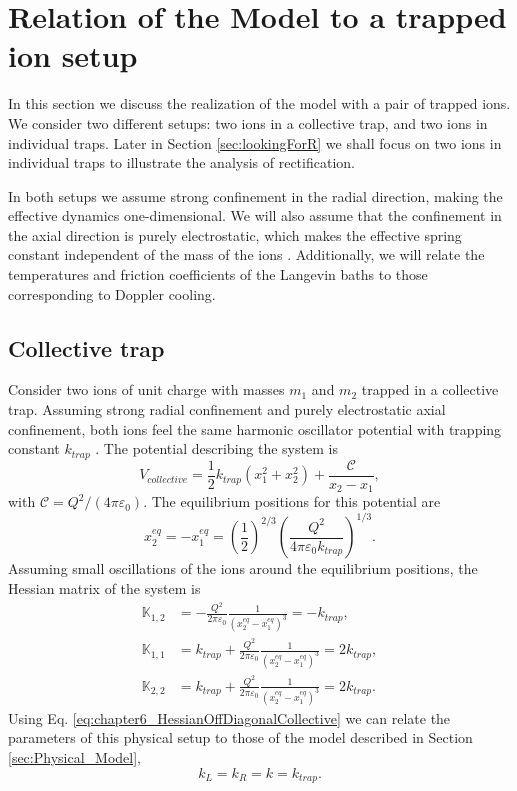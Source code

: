 \section{Relation of the Model to a trapped ion setup \label{sec:TrappedIonSetUp}}
%
In this section we discuss the realization of the model with  a pair of trapped ions. We consider two different setups: two ions in a collective trap, and two ions in individual traps. Later in Section \ref{sec:lookingForR} we shall focus on two ions in individual traps to illustrate the analysis of rectification.

In both setups we assume strong confinement in the radial direction, making the effective dynamics one-dimensional. We will also assume that the confinement in the axial direction is purely electrostatic, which makes the effective spring constant independent of the mass of the ions \cite{Leibfried2003}. Additionally, we will relate the temperatures and friction coefficients of the Langevin baths to those corresponding to Doppler cooling.
%
%
\subsection{Collective trap}
%
%
Consider two ions of unit charge with masses $m_1$ and $m_2$ trapped in a collective trap. Assuming strong radial confinement and purely electrostatic axial confinement, both ions feel the same harmonic oscillator potential with trapping constant $k_{trap}$ \cite{Leibfried2003}. The potential describing the system is
%
\begin{equation}
  V_{collective} = \frac{1}{2}k_{trap} \left( x_1^2 + x_2^2\right) + \frac{\mathcal{C}}{x_2-x_1},
\end{equation}
%
with $\mathcal{C}={Q^2}/({4\pi\varepsilon_0})$. The equilibrium positions for this potential are
%
\begin{equation}
  x_2^{eq} = -x_1^{eq} =
  \label{eq:chapter6_equilibriumPositionsCollectiveTrap}\left(\frac{1}{2}\right)^{2/3} \left(\frac{Q^2}{4\pi\varepsilon_0 k_{trap}}\right)^{1/3}.
\end{equation}
%
Assuming small oscillations of the ions around the equilibrium positions, the Hessian matrix of the system is
%
\begin{align}
  \mathbb{K}_{1,2} &= -\frac{Q^2}{2\pi\varepsilon_0}\frac{1}{(x_2^{eq}-x_1^{eq})^3} = -k_{trap},\nonumber
  \\
  \mathbb{K}_{1,1} &= k_{trap} + \frac{Q^2}{2\pi\varepsilon_0}\frac{1}{(x_2^{eq}-x_1^{eq})^3} = 2 k_{trap},\nonumber
  \\
  \mathbb{K}_{2,2} &= k_{trap} + \frac{Q^2}{2\pi\varepsilon_0}\frac{1}{(x_2^{eq}-x_1^{eq})^3} = 2 k_{trap}.
  \label{eq:chapter6_HessianOffDiagonalCollective}
\end{align}
%
Using Eq. \eqref{eq:chapter6_HessianOffDiagonalCollective} we can relate the parameters of this physical setup to those of the model described in Section \ref{sec:Physical_Model},
%
\begin{equation}
  k_L = k_R = k = k_{trap}.
\end{equation}
%
%
%
